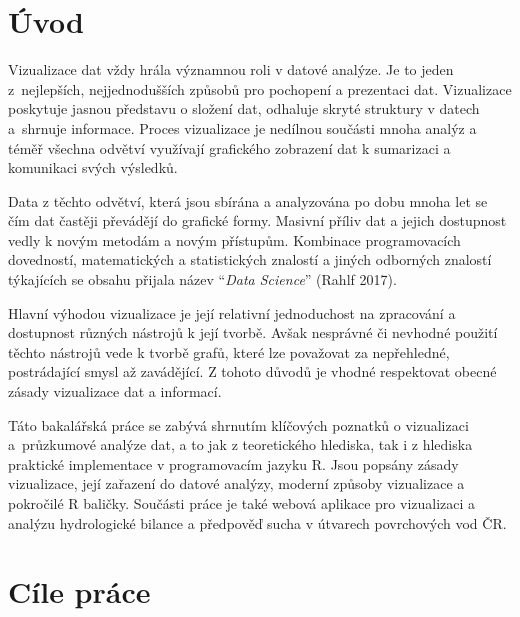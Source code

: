 \documentclass[12pt,]{article}
\title{}
\author{}
\date{}
\begin{document}


\tableofcontents

\newpage

\listoffigures
\listoftables

\newpage

\section{Úvod}\label{uvod}

\pagestyle{plain} \setcounter{page}{1}

\qquad Vizualizace dat vždy hrála významnou roli v datové analýze. Je to
jeden z~nejlepších, nejjednodušších způsobů pro pochopení a prezentaci
dat. Vizualizace poskytuje jasnou představu o složení dat, odhaluje
skryté struktury v datech a~shrnuje informace. Proces vizualizace je
nedílnou součásti mnoha analýz a téměř všechna odvětví využívají
grafického zobrazení dat k sumarizaci a komunikaci svých výsledků.

\qquad Data z těchto odvětví, která jsou sbírána a analyzována po dobu
mnoha let se čím dat častěji převádějí do grafické formy. Masivní příliv
dat a jejich dostupnost vedly k novým metodám a novým přístupům.
Kombinace programovacích dovedností, matematických a statistických
znalostí a jiných odborných znalostí týkajících se obsahu přijala název
\enquote{\emph{Data Science}} (Rahlf 2017).

\qquad Hlavní výhodou vizualizace je její relativní jednoduchost na
zpracování a dostupnost různých nástrojů k její tvorbě. Avšak nesprávné
či nevhodné použití těchto nástrojů vede k tvorbě grafů, které lze
považovat za nepřehledné, postrádající smysl až zavádějící. Z tohoto
důvodů je vhodné respektovat obecné zásady vizualizace dat a informací.

\qquad Táto bakalářská práce se zabývá shrnutím klíčových poznatků o
vizualizaci a~průzkumové analýze dat, a to jak z teoretického hlediska,
tak i z hlediska praktické implementace v programovacím jazyku R. Jsou
popsány zásady vizualizace, její zařazení do datové analýzy, moderní
způsoby vizualizace a pokročilé R baličky. Součásti práce je také webová
aplikace pro vizualizaci a analýzu hydrologické bilance a předpověď
sucha v útvarech povrchových vod ČR.

\newpage

\section{Cíle práce}\label{cile-prace}
\end{document}
